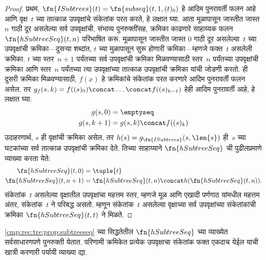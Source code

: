 \begin{proof}
  प्रथम, $\fn{ISubtrees}(t) = \fn{subseq}(t, 1, (t)_0)$ हे आदिम पुनरावर्ती
  फलन आहे आणि वृक्ष~$t$ च्या तात्काळ उपवृक्षांचे संकेतांक परत करते, हे लक्षात
  घ्या. आता मूळापासून जास्तीत जास्त $n$ गाठी दूर असलेल्या सर्व उपवृक्षांची,
  संभाव्य पुनरुक्तींसह, क्रमिका काढणारे साहाय्यक फलन
  $\fn{hSubtreeSeq}(t,n)$ परिभाषित करू. मूळापासून जास्तीत जास्त $0$ गाठी
  दूर असलेल्या~$t$ च्या उपवृक्षांची क्रमिका---दुसऱ्या शब्दांत, $t$ च्या
  मुळापासून सुरू होणारी क्रमिका---म्हणजे फक्त~$t$ असलेली क्रमिका. $t$ च्या
  स्तर~$n+1$ पर्यंतच्या सर्व उपवृक्षांची क्रमिका मिळवण्यासाठी स्तर~$n$
  पर्यंतच्या उपवृक्षांची क्रमिका आणि स्तर~$n$ पर्यंतच्या त्या उपवृक्षांच्या
  तात्काळ उपवृक्षांची क्रमिका यांची जोडणी करतो. ही दुसरी क्रमिका मिळवण्यासाठी,
  $f(x)$ हे क्रमिकांचे संकेतांक परत करणारे आदिम पुनरावर्ती फलन असेल, तर
  $g_f(s, k) = f((s)_0) \concat
  \dots \concat f((s)_{k-1})$ हेही आदिम पुनरावर्ती आहे, हे लक्षात घ्या:
    \begin{align*}
      g(s, 0) & = \emptyseq\\
      g(s, k+1) & = g(s, k) \concat f((s)_k)
    \end{align*}
    उदाहरणार्थ, $s$ ही वृक्षांची क्रमिका असेल, तर
    $h(s) = g_{\fn{ISubtrees}}(s, \len{s})$ ही~$s$ च्या घटकांच्या सर्व
    तात्काळ उपवृक्षांची क्रमिका देते. तिच्या साहाय्याने
    $\fn{hSubtreeSeq}$ ची पुढीलप्रमाणे व्याख्या करता येते:
    \begin{align*}
      \fn{hSubtreeSeq}(t, 0) & = \tuple{t} \\
      \fn{hSubtreeSeq}(t, n+1) & = \fn{hSubtreeSeq}(t, n) \concat
      h(\fn{hSubtreeSeq}(t, n)).
    \end{align*}
    संकेतांक~$t$ असलेल्या वृक्षातील उपवृक्षांचा महत्तम स्तर, म्हणजे मूळ आणि
    एखादी पर्णगाठ यांमधील महत्तम अंतर, संकेतांक~$t$ ने परिबद्ध असतो. म्हणून
    संकेतांक~$t$ असलेल्या वृक्षाच्या सर्व उपवृक्षांच्या संकेतांकांची क्रमिका
    $\fn{hSubtreeSeq}(t, t)$ ने मिळते.
\end{proof}

\begin{prob}
  \ref{cmp:rec:tre:prop:subtreeseq} च्या सिद्धतेतील
  $\fn{hSubtreeSeq}$ च्या व्याख्येत सर्वसाधारणपणे पुनरुक्ती येतात. परिणामी
  क्रमिकेत प्रत्येक उपवृक्षाचा संकेतांक फक्त एकदाच येईल याची खात्री करणारी
  पर्यायी व्याख्या द्या.
\end{prob}











